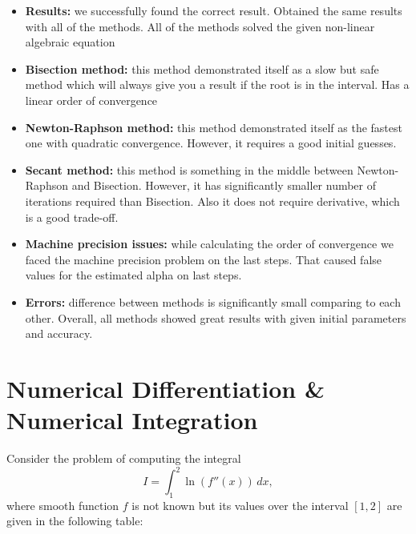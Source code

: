 \documentclass{article}
\begin{document}
\begin{itemize}
    \item \textbf{Results:} we successfully found the correct result.
    Obtained the same results with all of the methods. All of the methods solved the given non-linear algebraic equation
    \item \textbf{Bisection method:} this method demonstrated itself
    as a slow but safe method which will always give you a result if
    the root is in the interval. Has a linear order of convergence
    \item \textbf{Newton-Raphson method:} this method demonstrated
    itself as the fastest one with quadratic convergence. However, it
    requires a good initial guesses.
    \item \textbf{Secant method:} this method is something in the
    middle between Newton-Raphson and Bisection. However, it has
    significantly smaller number of iterations required than
    Bisection. Also it does not require derivative, which is a good
    trade-off.
    \item \textbf{Machine precision issues:} while calculating the order of convergence we faced the machine precision problem on the last steps. That caused false values for the estimated alpha on last steps.
    \item \textbf{Errors:} difference between methods is significantly small comparing to each other. Overall, all methods showed great results with given initial parameters and accuracy.
\end{itemize}

\newpage

\section{Numerical Differentiation \& Numerical Integration}

Consider the problem of computing the integral
\begin{equation}
    I = \int_{1}^{2} \ln(f''(x)) \, dx,
\end{equation}
where smooth function $f$ is not known but its values over the interval $[1, 2]$ are given in the following table:

\begin{center}
\end{center}  
\end{document}
